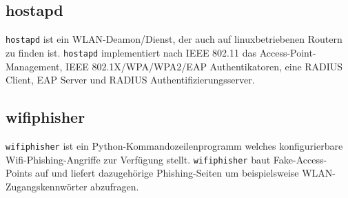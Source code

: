\subsection{hostapd}
\colorbox{altgray}{\lstinline|hostapd|} ist ein WLAN-Deamon/Dienst, der auch auf linuxbetriebenen Routern zu finden ist. \colorbox{altgray}{\lstinline|hostapd|} implementiert nach IEEE 802.11 das Access-Point-Management, IEEE 802.1X/WPA/WPA2/EAP Authentikatoren, eine RADIUS Client, EAP Server und RADIUS Authentifizierungsserver.
\subsection{wifiphisher}
\colorbox{altgray}{\lstinline|wifiphisher|} ist ein Python-Kommandozeilenprogramm welches konfigurierbare Wifi-Phishing-Angriffe zur Verfügung stellt. \colorbox{altgray}{\lstinline|wifiphisher|} baut Fake-Access-Points auf und liefert dazugehörige Phishing-Seiten um beispielsweise WLAN-Zugangskennwörter abzufragen.
